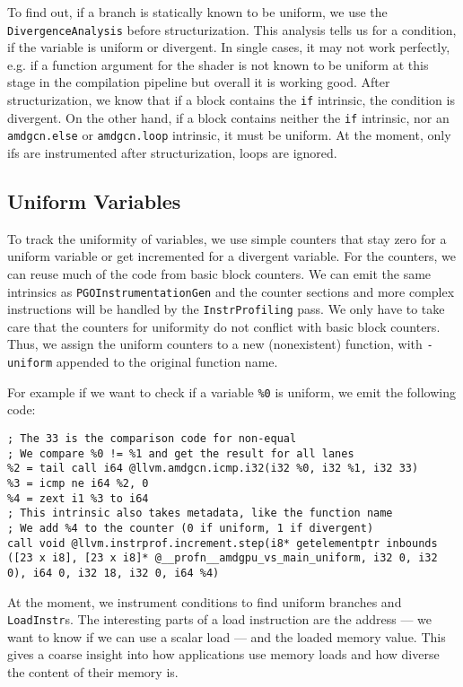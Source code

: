 To find out, if a branch is statically known to be uniform, we use the \texttt{DivergenceAnalysis} before structurization.
This analysis tells us for a condition, if the variable is uniform or divergent.
In single cases, it may not work perfectly, e.g. if a function argument for the shader is not known to be uniform at this stage in the compilation pipeline but overall it is working good.
After structurization, we know that if a block contains the \texttt{if} intrinsic, the condition is divergent.
On the other hand, if a block contains neither the \texttt{if} intrinsic, nor an \texttt{amdgcn.else} or \texttt{amdgcn.loop} intrinsic, it must be uniform.
At the moment, only ifs are instrumented after structurization, loops are ignored.

\subsection{Uniform Variables}
\label{sub:impl_uniform_vars}
To track the uniformity of variables, we use simple counters that stay zero for a uniform variable or get incremented for a divergent variable.
For the counters, we can reuse much of the code from basic block counters.
We can emit the same intrinsics as \texttt{PGOInstrumentationGen} and the counter sections and more complex instructions will be handled by the \texttt{InstrProfiling} pass.
We only have to take care that the counters for uniformity do not conflict with basic block counters.
Thus, we assign the uniform counters to a new (nonexistent) function, with \texttt{-uniform} appended to the original function name.

For example if we want to check if a variable \texttt{\%0} is uniform, we emit the following code:
\begin{lstlisting}[caption={Check a variable for uniformity},language={[x86masm]Assembler}]
%1 = tail call i32 @llvm.amdgcn.readfirstlane(i32 %0)
; The 33 is the comparison code for non-equal
; We compare %0 != %1 and get the result for all lanes
%2 = tail call i64 @llvm.amdgcn.icmp.i32(i32 %0, i32 %1, i32 33)
%3 = icmp ne i64 %2, 0
%4 = zext i1 %3 to i64
; This intrinsic also takes metadata, like the function name
; We add %4 to the counter (0 if uniform, 1 if divergent)
call void @llvm.instrprof.increment.step(i8* getelementptr inbounds ([23 x i8], [23 x i8]* @__profn__amdgpu_vs_main_uniform, i32 0, i32 0), i64 0, i32 18, i32 0, i64 %4)
\end{lstlisting}

At the moment, we instrument conditions to find uniform branches and \texttt{LoadInstr}s.
The interesting parts of a load instruction are the address --- we want to know if we can use a scalar load --- and the loaded memory value.
This gives a coarse insight into how applications use memory loads and how diverse the content of their memory is.

